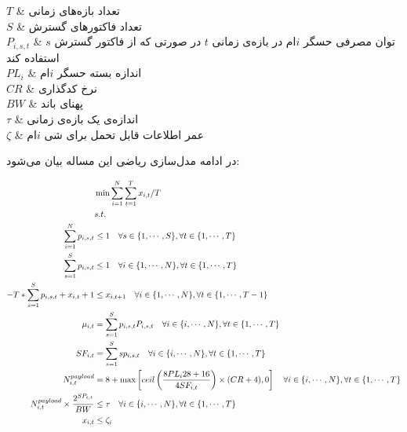 $T$ & تعداد بازه‌های زمانی \\

$S$ & تعداد فاکتورهای گسترش \\

$P_{i, s, t}$ & توان مصرفی حسگر $i$ام در بازه‌ی زمانی $t$ در صورتی که از فاکتور گسترش $s$ استفاده کند \\

$PL_{i}$ & اندازه بسته حسگر $i$ام \\

$CR$ & نرخ کدگذاری \\

$BW$ & پهنای باند \\

$\tau$ & اندازه‌ی یک بازه‌ی زمانی \\

$\zeta$ & عمر اطلاعات قابل تحمل برای شی $i$ام \\



در ادامه مدل‌سازی ریاضی این مساله بیان می‌شود:

\begin{align}
  &\min \sum_{i = 1}^{N} \sum_{t = 1}^{T} x_{i, t} / T \\
  &s.t. \notag \\
  \sum_{i = 1}^{N} p_{i, s, t} &\le 1 \quad \forall s \in \{1, \cdots, S\}, \forall t \in \{1, \cdots, T\} \label{eq:constr_subchannel_limit} \\
  \sum_{s = 1}^{S} p_{i, s, t} &\le 1 \quad \forall i \in \{1, \cdots, N\}, \forall t \in \{1, \cdots, T\} \label{eq:constr_thing_limit} \\
  -T * \sum_{s = 1}^{S} p_{i, s, t} + x_{i, t} + 1 &\le x_{i, t + 1} \quad \forall i \in \{1, \cdots, N\}, \forall t \in \{1, \cdots, T - 1\} \label{eq:constr_aoi_limit} \\
  \mu_{i, t} &= \sum_{s = 1}^{S} p_{i, s, t} P_{i, s, t}  \quad \forall i \in \{i, \cdots, N\}, \forall t \in \{1, \cdots, T\} \label{eq:constr_power_range} \\
  SF_{i, t} &= \sum_{s = 1}^{S} s p_{i, s, t} \quad \forall i \in \{i, \cdots, N\}, \forall t \in \{1, \cdots, T\} \label{eq:constr_set_sp} \\
  N^{payload}_{i, t} &= 8 + \max\left[ ceil \left( \frac{8 PL_{i} 28 + 16}{4 SF_{i, t}} \right) \times (CR + 4), 0 \right]
                       \quad \forall i \in \{i, \cdots, N\}, \forall t \in \{1, \cdots, T\}
                       \label{eq:constr_payload} \\
  N^{payload}_{i, t} \times \frac{2^{SP_{i, t}}}{BW} &\le \tau \quad \forall i \in \{i, \cdots, N\}, \forall t \in \{1, \cdots, T\}
                                                       \label{eq:constr_time_slot_threshold} \\
  x_{i, t} &\le \zeta_{i} \label{eq:constr_aoi_threshold} \\
\end{align}

